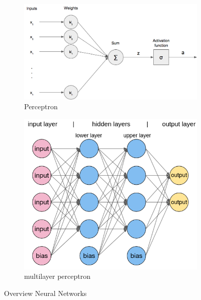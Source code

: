 \begin{figure}
    \begin{subfigure}{0.45\textwidth}
      \includegraphics[width=\linewidth]{images/perceptron.png}
      \caption{Perceptron} \label{fig:perceptron}
    \end{subfigure}%
    \hspace*{\fill}   %
    \begin{subfigure}{0.45\textwidth}
      \includegraphics[width=\linewidth]{images/mlp.png}
      \caption{multilayer perceptron} \label{fig:mlp}
    \end{subfigure}%
    \hspace*{\fill}   %
  \caption{Overview Neural Networks} \label{fig:NN_Overview}
\end{figure}





